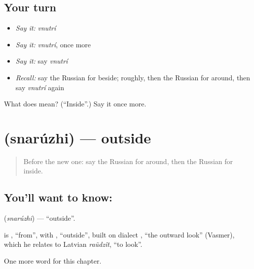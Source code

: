 \subsection*{Your turn}
\begin{itemize}
\raggedright
  \item \emph{Say it:} \emph{vnutrí}
  \item \emph{Say it:} \emph{vnutrí}, once more
  \item \emph{Say it:} say \emph{vnutrí}
  \item \emph{Recall:} say the Russian for beside; roughly, then the Russian for around, then say \emph{vnutrí} again
\end{itemize}

\begin{tcolorbox}[breakable,colback=teal!4,colframe=teal!35!black,title={Before you move on}]
What does  mean? (\textquotedblleft{}Inside\textquotedblright{}.) Say it once more.
\end{tcolorbox}
\section[\texorpdfstring{\ru{снаружи} (snarúzhi)}{снаружи (snarúzhi)}]{ (snarúzhi) — outside}

\label{lesson:RU-C152-snaruzhi}



\begin{quote}
Before the new one: say the Russian for around, then the Russian for inside.
\end{quote}

\subsection*{You'll want to know: }
\textbf{} (\emph{snarúzhi}) — \textquotedblleft{}outside\textquotedblright{}.

\begin{cousinweb}
\textbf{} is \emph{}, \textquotedblleft{}from\textquotedblright{}, with \emph{}, \textquotedblleft{}outside\textquotedblright{}, built on dialect \emph{}, \textquotedblleft{}the outward look\textquotedblright{} (Vasmer), which he relates to Latvian \emph{raũdzît}, \textquotedblleft{}to look\textquotedblright{}.
\end{cousinweb}

\begin{grammarlens}[title={What you've built}]
One more word for this chapter.
\end{grammarlens}

